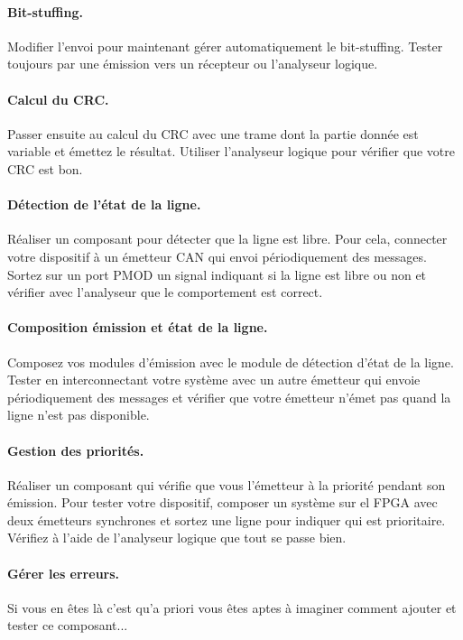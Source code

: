 \documentclass[11pt]{paper}
\begin{document}
\paragraph{Bit-stuffing. } Modifier l'envoi pour maintenant gérer automatiquement le bit-stuffing. Tester toujours par une émission vers un récepteur ou l'analyseur logique.

\paragraph{Calcul du CRC.} Passer ensuite au calcul du CRC avec une trame dont la partie donnée est variable et émettez le résultat. Utiliser l'analyseur logique pour vérifier que votre CRC est bon.

\paragraph{Détection de l'état de la ligne.} Réaliser un composant pour détecter que la ligne est libre. Pour cela, connecter votre dispositif à un émetteur CAN qui envoi périodiquement des messages. Sortez sur un port PMOD un signal indiquant si la ligne est libre ou non et vérifier avec l'analyseur que le comportement est correct.

\paragraph{Composition émission et état de la ligne.} Composez vos modules d'émission avec le module de détection d'état de la ligne. Tester en interconnectant votre système avec un autre émetteur qui envoie périodiquement des messages et vérifier que votre émetteur n'émet pas quand la ligne n'est pas disponible.

\paragraph{Gestion des priorités.} Réaliser un composant qui vérifie que vous l'émetteur à la priorité pendant son émission. Pour tester votre dispositif, composer un système sur el FPGA avec deux émetteurs synchrones et sortez une ligne pour indiquer qui est prioritaire. Vérifiez à l'aide de l'analyseur logique que tout se passe bien.

\paragraph{Gérer les erreurs.} Si vous en êtes là c'est qu'a priori vous êtes aptes à imaginer comment ajouter et tester ce composant...

\medskip
{}
\end{document}
